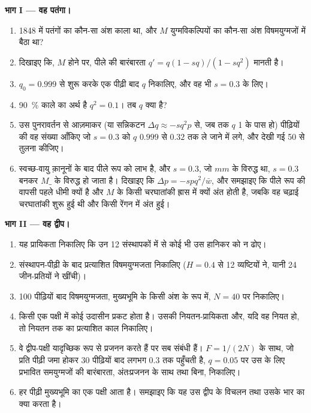 \begin{problem}
\medskip
\noindent\textbf{भाग I --- वह पतंगा।}
\begin{enumerate}
  \item 1848 में पतंगों का कौन-सा अंश काला था, और $M$ युग्मविकल्पियों का
        कौन-सा अंश विषमयुग्मजों में बैठा था?
  \item दिखाइए कि, $M$  होने पर, पीले  की बारंबारता
        $q' = q(1 - sq)/(1 - sq^{2})$ मानती है।
  \item $q_0 = 0.999$ से शुरू करके एक पीढ़ी बाद $q$ निकालिए, और वह भी
        $s = 0.3$ के लिए।
  \item \qty{90}{\%} काले का अर्थ है $q^{2} = 0.1$। तब $q$ क्या है?
  \item उस पुनरावर्तन से आज़माकर (या सन्निकटन
        $\Delta q \approx -sq^{2}p$ से, जब तक $q$ 1 के पास हो) पीढ़ियों की वह
        संख्या आँकिए जो $s = 0.3$ को $q$ $0.999$ से
        $0.32$ तक ले जाने में लगे, और देखी गई 50 से तुलना कीजिए।
  \item स्वच्छ-वायु क़ानूनों के बाद पीले रूप को लाभ है, और $s
        = 0.3$, जो $mm$ के विरुद्ध था, $s = 0.3$ बनकर $M\_$ के विरुद्ध हो जाता है। दिखाइए
        कि $\Delta p = -spq^{2}/\bar w$, और समझाइए कि पीले रूप की वापसी
        पहले धीमी क्यों है और $M$ के किसी चरघातांकी ह्रास में क्यों अंत होती है,
        जबकि वह चढ़ाई चरघातांकी शुरू हुई थी और
        किसी रेंगन में अंत हुई।
\end{enumerate}

\medskip
\noindent\textbf{भाग II --- वह द्वीप।}
\begin{enumerate}[resume]
  \item यह प्रायिकता निकालिए कि उन 12 संस्थापकों में से कोई भी उस
        हानिकर  को न ढोए।
  \item संस्थापन-पीढ़ी के बाद प्रत्याशित विषमयुग्मजता निकालिए
        ($H = 0.4$ से 12 व्यष्टियों ने, यानी 24
        जीन-प्रतियों ने खींची)।
  \item 100 पीढ़ियों बाद विषमयुग्मजता, मुख्यभूमि के किसी अंश के रूप में, $N =
        40$ पर निकालिए।
  \item किसी एक पक्षी में कोई उदासीन  प्रकट होता है। उसकी
        नियतन-प्रायिकता और, यदि वह नियत हो, तो नियतन तक का प्रत्याशित काल
        निकालिए।
  \item वे द्वीप-पक्षी यादृच्छिक रूप से प्रजनन करते हैं पर सब संबंधी हैं।
        $F = 1/(2N)$ के साथ, जो प्रति पीढ़ी जमा होकर 30 पीढ़ियों बाद
        लगभग $0.3$ तक पहुँचती है, $q = 0.05$ पर उस  के लिए
        प्रभावित समयुग्मजों की बारंबारता, अंतःप्रजनन के साथ तथा बिना, निकालिए।
  \item हर पीढ़ी मुख्यभूमि का एक पक्षी आता है। समझाइए कि यह
        उस द्वीप के विचलन तथा उसके भार का क्या करता है।
\end{enumerate}


\end{problem}
